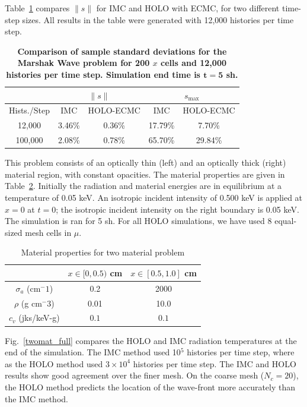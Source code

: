 \documentclass{mc2013}
\renewcommand{\ss}{\ensuremath{\|s\|}}
\begin{document}
Table~\ref{marshak_var} compares $\ss$ for IMC and HOLO with ECMC, for two different
time-step sizes. All results in the table were generated
with 12,000 histories per time step.  
\begin{table}[H]
\centering
\caption{\label{marshak_var} \textbf{Comparison of sample standard deviations for the Marshak Wave problem
    for 200 $x$ cells and 12,000 histories per time step.   Simulation end time is $\mathbf{t=5}$ sh.}}
\vspace{-0.1in}
\begin{tabular}{|c|cc|cc|}\cline{2-5}
    \multicolumn{1}{c|}{}       & \multicolumn{2}{|c|}{\ss} & \multicolumn{2}{|c|}{$s_{\max}$} \\ \hline
Hists./Step   & IMC & HOLO-ECMC  &  IMC & HOLO-ECMC   \\ \hline
   12,000	 & 3.46\%  & 0.36\% &  17.79\%    &  7.70\%            \\
  100,000    & 2.08\%  & 0.78\% &  65.70\%    & 29.84\%     \\ \hline
\end{tabular}
\end{table}




This problem consists of an optically thin (left) and an optically thick (right) material region,
with constant opacities.  The material properties are given in
Table~\ref{two_mat_props}.  Initially the radiation and material energies are in
equilibrium at a temperature of 0.05 keV.  An isotropic incident intensity of 0.500 keV
is applied at $x=0$ at $t=0$; the isotropic incident intensity on the right boundary is 0.05
keV.  The simulation is ran for 5 sh. For all HOLO simulations, we have used 8 equal-sized mesh cells in $\mu$.
\begin{table}[H]
        \caption{Material properties for two material problem\label{two_mat_props}}
\centering
        \begin{tabular}{|c|cc|}  \cline{2-3}
            \multicolumn{1}{c|}{}   & $x \in [0,0.5)$ cm & $x \in [0.5,1.0]$ cm   \\ \hline
            $\sigma_a$ (cm$^-1$)  & 0.2 & 2000 \\
            $\rho$ (g cm$^-3$) & 0.01 & 10.0 \\
            $c_v$ (jks/keV-g) & $0.1$ & $0.1$ \\ \hline
        \end{tabular}
\end{table}
Fig.~\ref{twomat_full} compares the HOLO and IMC radiation 
temperatures at the end of the simulation. The IMC method used 10$^5$ histories per
time step, where as the HOLO method used $3\times10^4$ histories per time step.  The
IMC and HOLO results show good agreement
over the finer mesh.
On the coarse mesh ($N_c=20$), the HOLO method predicts the location of the
wave-front more accurately than the IMC method. 
\end{document}
